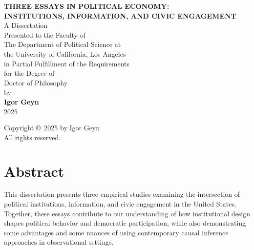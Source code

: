 \documentclass[12pt,letterpaper,oneside]{book}
\begin{document}
\frontmatter
\pagestyle{plain}

\begin{titlepage}
\begin{center}
\vspace*{1in}

{\LARGE\bfseries THREE ESSAYS IN POLITICAL ECONOMY:}\\[0.5em]
{\LARGE\bfseries INSTITUTIONS, INFORMATION, AND CIVIC ENGAGEMENT}\\[2in]

{\Large A Dissertation}\\[0.5em]
{\Large Presented to the Faculty of}\\[0.5em]
{\Large The Department of Political Science at}\\[0.5em]
{\Large the University of California, Los Angeles}\\[0.5em]
{\Large in Partial Fulfillment of the Requirements}\\[0.5em]
{\Large for the Degree of}\\[0.5em]
{\Large Doctor of Philosophy}\\[2in]

{\Large by}\\[0.5em]
{\Large\bfseries Igor Geyn}\\[2in]

{\Large 2025}
\end{center}
\end{titlepage}

\clearpage
\thispagestyle{empty}
\vspace*{\fill}
\begin{center}
Copyright \copyright\ 2025 by Igor Geyn\\
All rights reserved.
\end{center}
\vspace*{\fill}
\clearpage

\chapter*{Abstract}

This dissertation presents three empirical studies examining the intersection of political institutions, information, and civic engagement in the United States. Together, these essays contribute to our understanding of how institutional design shapes political behavior and democratic participation, while also demonstrating some advantages and some nuances of using contemporary causal inference approaches in observational settings.
\end{document}
